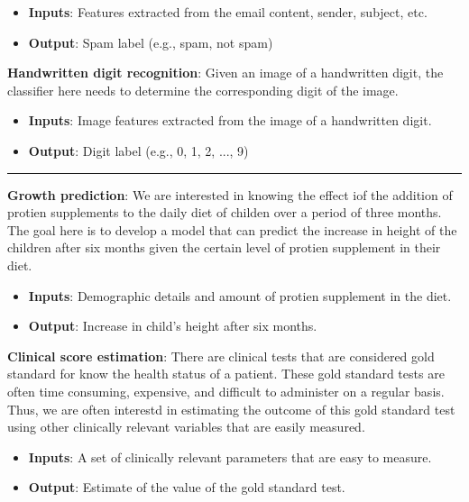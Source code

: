 \begin{boxedstuff}
\begin{example}
        \begin{itemize}
            \item \textbf{Inputs}: Features extracted from the email content, sender, subject, etc.
            \item \textbf{Output}: Spam label (e.g., spam, not spam)
        \end{itemize}
    \end{example}
    \begin{example}
        \textbf{Handwritten digit recognition}: Given an image of a handwritten digit, the classifier here needs to determine the corresponding digit of the image.
        \begin{itemize}
            \item \textbf{Inputs}: Image features extracted from the image of a handwritten digit.
            \item \textbf{Output}: Digit label (e.g., 0, 1, 2, ..., 9)
        \end{itemize}
    \end{example}

    \vspace{4mm}
    \hrule
    \begin{example}
        \textbf{Growth prediction}: We are interested in knowing the effect iof the addition of protien supplements to the daily diet of childen over a period of three months. The goal here is to develop a model that can predict the increase in height of the children after six months given the certain level of protien supplement in their diet.
        \begin{itemize}
            \item \textbf{Inputs}: Demographic details and amount of protien supplement in the diet.
            \item \textbf{Output}: Increase in child's height after six months.
        \end{itemize}
    \end{example}
    \begin{example}
        \textbf{Clinical score estimation}: There are clinical tests that are considered gold standard for know the health status of a patient. These gold standard tests are often time consuming, expensive, and difficult to administer on a regular basis. Thus, we are often interestd in estimating the outcome of this gold standard test using other clinically relevant variables that are easily measured.
        \begin{itemize}
            \item \textbf{Inputs}: A set of clinically relevant parameters that are easy to measure.
            \item \textbf{Output}: Estimate of the value of the gold standard test.
        \end{itemize}
    \end{example}
\end{boxedstuff}

